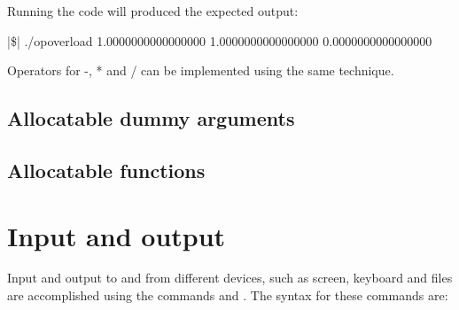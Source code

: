 Running the code will produced the expected output:

\cmdmode

\begin{fortrancodeenv}
|\$| ./opoverload
   1.0000000000000000        1.0000000000000000        0.0000000000000000
\end{fortrancodeenv}

\fmode

Operators for -, * and / can be implemented using the same technique.

\subsection{Allocatable dummy arguments}


\subsection{Allocatable functions}



%
%
%

\section{Input and output}

Input and output to and from different devices, such as screen, keyboard and files are accomplished using the commands  and . The syntax for these commands are:

